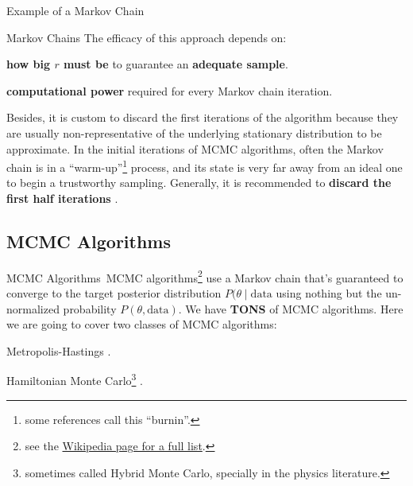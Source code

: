 \begin{frame}{Example of a Markov Chain}
	\centering
\end{frame}

\begin{frame}{Markov Chains}
	The efficacy of this approach depends on:
	\begin{vfilleditems}
		\item \textbf{how big $r$ must be} to guarantee an \textbf{adequate sample}.
		\item \textbf{computational power} required for every Markov chain iteration.
	\end{vfilleditems}

	\vfill
	\footnotesize
	Besides, it is custom to discard the first iterations of the algorithm because
	they are usually non-representative of the underlying stationary distribution to be approximate.
	In the initial iterations of MCMC algorithms,
	often the Markov chain is in a ``warm-up''\footnote{some references call this ``burnin''.} process,
	and its state is very far away from an ideal one to begin a trustworthy sampling.
	\vfill
	Generally, it is recommended to \textbf{discard the first half iterations} \parencite{gelmanBasicsMarkovChain2013}.
\end{frame}

\subsection{MCMC Algorithms}
\begin{frame}{MCMC Algorithms}\
	MCMC algorithms\footnote{see the \href{https://en.wikipedia.org/wiki/Markov_chain_Monte_Carlo}{Wikipedia page for a full list}.} use a Markov chain that's guaranteed to converge to the target posterior distribution $P(\theta \mid \text{data}$ using nothing but the un-normalized probability $P(\theta, \text{data})$.
	\vfill
	We have \textbf{TONS} of MCMC algorithms.
	Here we are going to cover two classes of MCMC algorithms:
	\begin{vfilleditems}
		\item Metropolis-Hastings \parencite{metropolisEquationStateCalculations1953, hastingsMonteCarloSampling1970}.
		\item Hamiltonian Monte Carlo\footnote{sometimes called Hybrid Monte Carlo, specially in the physics literature.} \parencite{neal2011mcmc, betancourtConceptualIntroductionHamiltonian2017}.
	\end{vfilleditems}
\end{frame}



